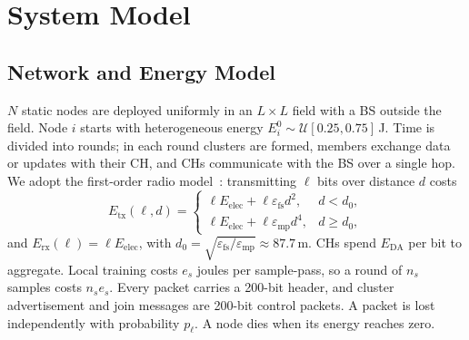\documentclass[journal]{IEEEtran}
\begin{document}
\section{System Model}\label{sec:model}
\subsection{Network and Energy Model}
$N$ static nodes are deployed uniformly in an $L\times L$ field with a BS outside the field. Node $i$ starts with heterogeneous energy $E_i^0\sim\mathcal{U}[0.25,0.75]$\,J. Time is divided into rounds; in each round clusters are formed, members exchange data or updates with their CH, and CHs communicate with the BS over a single hop. We adopt the first-order radio model~\cite{heinzelman2002}: transmitting $\ell$ bits over distance $d$ costs
\begin{equation}
E_{\mathrm{tx}}(\ell,d)=\begin{cases}\ell E_{\mathrm{elec}}+\ell\varepsilon_{\mathrm{fs}}d^{2}, & d<d_0,\\ \ell E_{\mathrm{elec}}+\ell\varepsilon_{\mathrm{mp}}d^{4}, & d\ge d_0,\end{cases}
\end{equation}
and $E_{\mathrm{rx}}(\ell)=\ell E_{\mathrm{elec}}$,
with $d_0=\sqrt{\varepsilon_{\mathrm{fs}}/\varepsilon_{\mathrm{mp}}}\approx 87.7$\,m. CHs spend $E_{\mathrm{DA}}$ per bit to aggregate. Local training costs $e_s$ joules per sample-pass, so a round of $n_s$ samples costs $n_se_s$. Every packet carries a 200-bit header, and cluster advertisement and join messages are 200-bit control packets. A packet is lost independently with probability $p_\ell$. A node dies when its energy reaches zero. 
\end{document}
